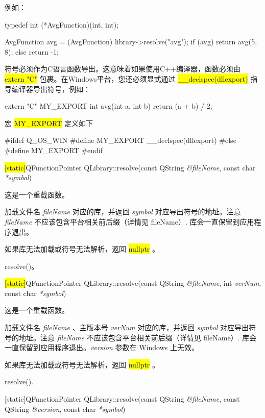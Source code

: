 例如：

\begin{cppcode}
typedef int (*AvgFunction)(int, int);

AvgFunction avg = (AvgFunction) library->resolve("avg");
if (avg)
    return avg(5, 8);
else
    return -1;
\end{cppcode}

符号必须作为C语言函数导出。这意味着如果使用C++编译器，函数必须由
\hl{extern "C"} 包裹。在Windows平台，您还必须显式通过 \hl{\_\_declspec(dllexport)}
指导编译器导出符号，例如：

\begin{cppcode}
extern "C" MY_EXPORT int avg(int a, int b)
{
    return (a + b) / 2;
}
\end{cppcode}

宏 \hl{MY\_EXPORT} 定义如下

\begin{cppcode}
#ifdef Q_OS_WIN
#define MY_EXPORT __declspec(dllexport)
#else
#define MY_EXPORT
#endif
\end{cppcode}

\hl{[static]}QFunctionPointer QLibrary::resolve(const QString \emph{\&fileName}, const char \emph{*symbol})

这是一个重载函数。

加载文件名 \emph{fileName} 对应的库，并返回 \emph{symbol} 对应导出符号的地址。注意 \emph{fileName} 不应该包含平台相关前后缀（详情见 fileName）. 库会一直保留到应用程序退出。

如果库无法加载或符号无法解析，返回 \hl{nullptr} 。

\begin{seeAlso}
resolve()。
\end{seeAlso}

\hl{[static]}QFunctionPointer QLibrary::resolve(const QString
\emph{\&fileName}, int \emph{verNum}, const char \emph{*symbol})

这是一个重载函数。

加载文件名 \emph{fileName} 、主版本号 \emph{verNum} 对应的库，并返回 \emph{symbol} 对应导出符号的地址。注意 \emph{fileName} 不应该包含平台相关前后缀（详情见 fileName）. 库会一直保留到应用程序退出。\emph{version} 参数在 Windows 上无效。

如果库无法加载或符号无法解析，返回 \hl{nullptr} 。

\begin{seeAlso}
resolve().
\end{seeAlso}

[static]QFunctionPointer QLibrary::resolve(const QString \emph{\&fileName}, const QString \emph{\&version}, const char \emph{*symbol})

